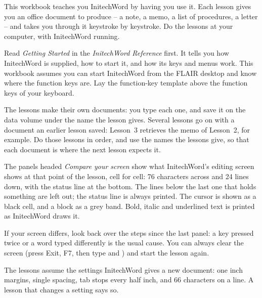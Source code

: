 This workbook teaches you InitechWord by having you use it.  Each lesson
gives you an office document to produce -- a note, a memo, a list of
procedures, a letter -- and takes you through it keystroke by keystroke.
Do the lessons at your computer, with InitechWord running.

Read \textit{Getting Started} in the \textit{InitechWord Reference} first.
It tells you how InitechWord is supplied, how to start it, and how its keys
and menus work.  This workbook assumes you can start InitechWord from the
FLAIR desktop and know where the function keys are.  Lay the function-key
template above the function keys of your keyboard.

The lessons make their own documents: you type each one, and save it on the
data volume under the name the lesson gives.  Several lessons go on with a
document an earlier lesson saved: Lesson~3 retrieves the memo of Lesson~2,
for example.  Do those lessons in order, and use the names the lessons give,
so that each document is where the next lesson expects it.

The panels headed \textit{Compare your screen} show what InitechWord's
editing screen shows at that point of the lesson, cell for cell: 76
characters across and 24 lines down, with the status line at the bottom.
The lines below the last one that holds something are left out; the status
line is always printed.  The cursor is shown as a black cell, and a block as a grey band.
Bold, italic and underlined text is printed as InitechWord draws it.

If your screen differs, look back over the steps since the last panel: a
key pressed twice or a word typed differently is the usual cause.  You can
always clear the screen (press Exit, F7, then type  and )
and start the lesson again.

The lessons assume the settings InitechWord gives a new document: one inch
margins, single spacing, tab stops every half inch, and 66 characters on a
line.  A lesson that changes a setting says so.

